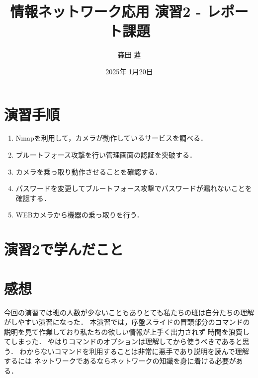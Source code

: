\documentclass{jlreq}
\title{情報ネットワーク応用 演習2 - レポート課題}
\author{森田 蓮}
\date{2025年 1月20日}
\begin{document}
\maketitle

\section{演習手順}
\begin{enumerate}
    \item Nmapを利用して，カメラが動作しているサービスを調べる．
    \item ブルートフォース攻撃を行い管理画面の認証を突破する．
    \item カメラを乗っ取り動作させることを確認する．
    \item パスワードを変更してブルートフォース攻撃でパスワードが漏れないことを確認する．
    \item WEBカメラから機器の乗っ取りを行う．
\end{enumerate}

\section{演習2で学んだこと}

\section{感想}
今回の演習では班の人数が少ないこともありとても私たちの班は自分たちの理解がしやすい演習になった．
本演習では，序盤スライドの冒頭部分のコマンドの説明を見て作業しており私たちの欲しい情報が上手く出力されず
時間を浪費してしまった．
やはりコマンドのオプションは理解してから使うべきであると思う．
わからないコマンドを利用することは非常に悪手であり説明を読んで理解するには
ネットワークであるならネットワークの知識を身に着ける必要がある．
\end{document}
